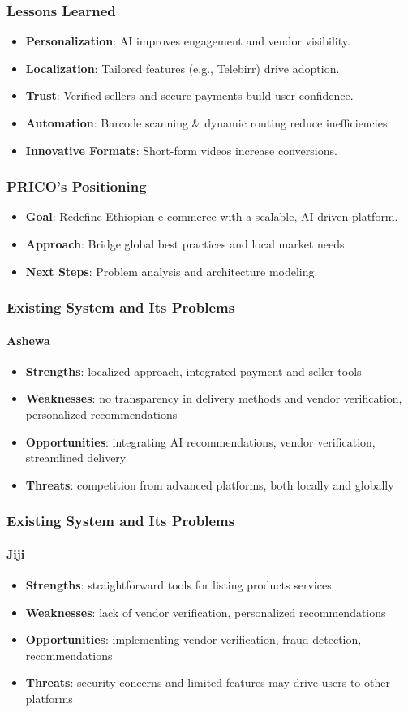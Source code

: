 \documentclass{beamer}
\begin{document}
\begin{frame}
	\frametitle{Lessons Learned}
	\begin{itemize}
		\item \textbf{Personalization}: AI improves engagement and vendor visibility.
		\item \textbf{Localization}: Tailored features (e.g., Telebirr) drive adoption.
		\item \textbf{Trust}: Verified sellers and secure payments build user confidence.
		\item \textbf{Automation}: Barcode scanning & dynamic routing reduce inefficiencies.
		\item \textbf{Innovative Formats}: Short-form videos increase conversions.
	\end{itemize}
\end{frame}

\begin{frame}
	\frametitle{PRICO’s Positioning}
	\begin{itemize}
		\item \textbf{Goal}: Redefine Ethiopian e-commerce with a scalable, AI-driven platform.
		\item \textbf{Approach}: Bridge global best practices and local market needs.
		\item \textbf{Next Steps}: Problem analysis and architecture modeling.
	\end{itemize}
\end{frame}

\begin{frame}
	\frametitle{Existing System and Its Problems}
	\framesubtitle{Ashewa}
	\begin{itemize}
		\item \textbf{Strengths}: localized approach, integrated payment and
		      seller tools
		\item \textbf{Weaknesses}: no transparency in delivery methods and
		      vendor verification, personalized recommendations
		\item \textbf{Opportunities}: integrating AI recommendations, vendor
		      verification, streamlined delivery
		\item \textbf{Threats}: competition from advanced platforms, both
		      locally and globally
	\end{itemize}
\end{frame}

\begin{frame}
	\frametitle{Existing System and Its Problems}
	\framesubtitle{Jiji}
	\begin{itemize}
		\item \textbf{Strengths}: straightforward tools for listing products
		      services
		\item \textbf{Weaknesses}: lack of vendor verification, personalized
		      recommendations
		\item \textbf{Opportunities}: implementing vendor verification, fraud
		      detection, recommendations
		\item \textbf{Threats}: security concerns and limited features may
		      drive users to other platforms
	\end{itemize}
\end{frame}
\end{document}

